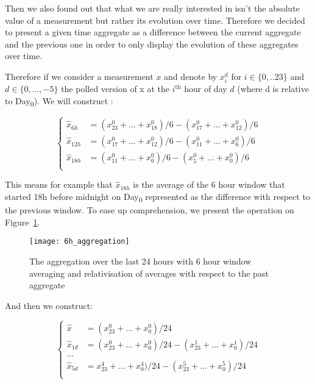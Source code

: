 Then we also found out that what we are really interested in isn't the absolute value of a measurement but rather its evolution over time. Therefore we decided to present a given time aggregate as a difference between the current aggregate and the previous one in order to only display the evolution of these aggregates over time. 

Therefore if we consider a measurement $x$ and denote by $x^d_i$ for $i \in \{0,..23\}$ and $d \in \{0,...,-5\}$  the polled version of x at the $i^\text{th}$ hour of day $d$ (where d is relative to Day\textsubscript{0}). We will construct : 

\begin{equation}
\begin{cases}
	\hat{x}_{6h} &= (x^0_{23}+...+x^0_{18})/6 - (x^0_{17}+...+x^0_{12})/6\\
	\hat{x}_{12h} &= (x^0_{17}+...+x^0_{12})/6 - (x^0_{11}+...+x^0_{6})/6\\
	\hat{x}_{18h} &= (x^0_{11}+...+x^0_{6})/6 - (x^0_{5}+...+x^0_{0})/6\\
\end{cases}
\end{equation}

This means for example that $\hat{x}_{18h}$ is the average of the 6 hour window that started 18h before midnight on Day\textsubscript{0} represented as the difference with respect to the previous window. To ease up comprehension, we present the operation on Figure~\ref{6h_agg}.

\begin{figure}[ht]
    \begin{center}
    \texttt{[image: 6h\_aggregation]}
    \end{center}
    \caption{The aggregation over the last 24 hours with 6 hour window averaging and relativisation of averages with respect to the past aggregate}
    \label{6h_agg}
\end{figure}


And then we construct:

\begin{equation}
\begin{cases}
	\hat{x} &= (x^0_{23}+...+x^0_{0})/24\\
	\hat{x}_{1d} &= (x^0_{23}+...+x^0_{0})/24 - (x^1_{23}+...+x^1_{0})/24\\
	...\\
	\hat{x}_{5d} &= x^4_{23}+...+x^4_{0})/24 - (x^5_{23}+...+x^5_{0})/24\\
\end{cases}
\end{equation}

